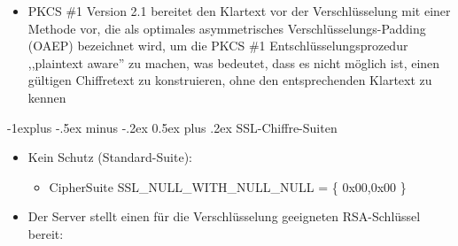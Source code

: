 \documentclass[a4paper]{article}
\makeatletter
\renewcommand{\subsection}{\@startsection{subsection}{2}{0mm}%
 {-1explus -.5ex minus -.2ex}%
 {0.5ex plus .2ex}%
 {\normalfont\normalsize\bfseries}}
\makeatother
\begin{document}
\begin{multicols}{3}
\begin{itemize}
\begin{itemize}
                        \begin{itemize}
                            \item
                                  PKCS \#1 Version 2.1 bereitet den Klartext vor der Verschlüsselung
                                  mit einer Methode vor, die als optimales asymmetrisches
                                  Verschlüsselungs-Padding (OAEP) bezeichnet wird, um die PKCS \#1
                                  Entschlüsselungsprozedur ,,plaintext aware'' zu machen, was
                                  bedeutet, dass es nicht möglich ist, einen gültigen Chiffretext zu
                                  konstruieren, ohne den entsprechenden Klartext zu kennen
                        \end{itemize}
              \end{itemize}
    \end{itemize}


    \subsection{SSL-Chiffre-Suiten}

    \begin{itemize}
        \item
              Kein Schutz (Standard-Suite):

              \begin{itemize}
                  \item
                        CipherSuite SSL\_NULL\_WITH\_NULL\_NULL = \{ 0x00,0x00 \}
              \end{itemize}
        \item
              Der Server stellt einen für die Verschlüsselung geeigneten
              RSA-Schlüssel bereit:


\end{itemize}
\end{multicols}
\end{document}
